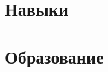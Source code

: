 \documentclass[letter,10pt]{article}
\begin{document}


\section{Навыки}


% 

\section{Образование}



% 
\end{document}
